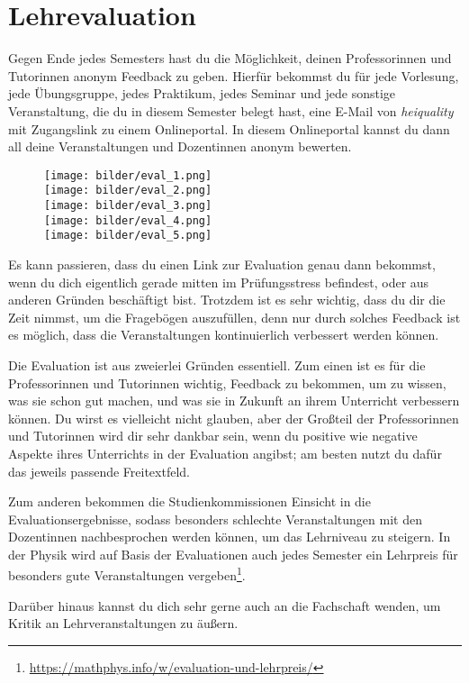 \section{Lehrevaluation}
\label{eval}

Gegen Ende jedes Semesters hast du die Möglichkeit, deinen Professorinnen und Tutorinnen anonym Feedback zu geben. Hierfür bekommst du für jede Vorlesung, jede Übungsgruppe, jedes Praktikum, jedes Seminar und jede sonstige Veranstaltung, die du in diesem Semester belegt hast, eine E-Mail von \textit{heiquality} mit Zugangslink zu einem Onlineportal. In diesem Onlineportal kannst du dann all deine Veranstaltungen und Dozentinnen anonym bewerten.

\begin{figure}[b]
    \begin{center}
        \texttt{[image: bilder/eval\_1.png]}\\
        \texttt{[image: bilder/eval\_2.png]}\\
        \texttt{[image: bilder/eval\_3.png]}\\
        \texttt{[image: bilder/eval\_4.png]}\\
        \texttt{[image: bilder/eval\_5.png]}\\
    \end{center}
\end{figure}

Es kann passieren, dass du einen Link zur Evaluation genau dann bekommst, wenn du dich eigentlich gerade mitten im Prüfungsstress befindest, oder aus anderen Gründen beschäftigt bist. Trotzdem ist es sehr wichtig, dass du dir die Zeit nimmst, um die Fragebögen auszufüllen, denn nur durch solches Feedback ist es möglich, dass die Veranstaltungen kontinuierlich verbessert werden können.

Die Evaluation ist aus zweierlei Gründen essentiell.
Zum einen ist es für die Professorinnen und Tutorinnen wichtig, Feedback zu bekommen, um zu wissen, was sie schon gut machen, und was sie in Zukunft an ihrem Unterricht verbessern können. Du wirst es vielleicht nicht glauben, aber der Großteil der Professorinnen und Tutorinnen wird dir sehr dankbar sein, wenn du positive wie negative Aspekte ihres Unterrichts in der Evaluation angibst; am besten nutzt du dafür das jeweils passende Freitextfeld.

Zum anderen bekommen die Studienkommissionen Einsicht in die Evaluationsergebnisse, sodass besonders schlechte Veranstaltungen mit den Dozentinnen nachbesprochen werden können, um das Lehrniveau zu steigern. In der Physik wird auf Basis der Evaluationen auch jedes Semester ein Lehrpreis für besonders gute Veranstaltungen vergeben\footnote{\url{https://mathphys.info/w/evaluation-und-lehrpreis/}}.

Darüber hinaus kannst du dich sehr gerne auch an die Fachschaft wenden, um Kritik an Lehrveranstaltungen zu äußern.
